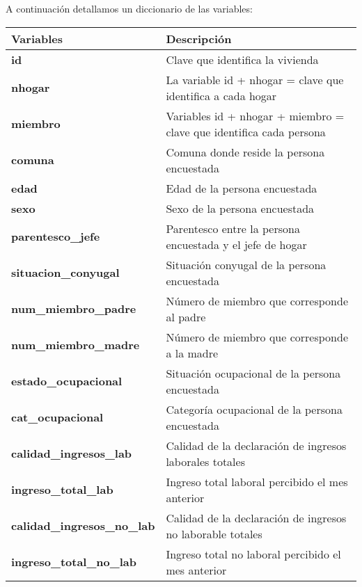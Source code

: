\documentclass[a4paper]{article}
\begin{document}
    A continuación detallamos un diccionario de las variables:
    \begin{table}[H]
    \begin{tabular}{|l|l|}
        \hline
        \textbf{Variables}                     & \textbf{Descripción} \\ \hline
        \textbf{id}                            & Clave que identifica la vivienda \\ \hline
        \textbf{nhogar}                        & La variable id + nhogar = clave que identifica a cada hogar \\ \hline
        \textbf{miembro}                       & Variables id + nhogar + miembro = clave que identifica  cada persona \\ \hline
        \textbf{comuna}                        & Comuna donde reside la persona encuestada \\ \hline
        \textbf{edad}                          & Edad de la persona encuestada \\ \hline
        \textbf{sexo}                          & Sexo de la persona encuestada \\ \hline
        \textbf{parentesco\_jefe}              & Parentesco entre la persona encuestada y el jefe de hogar \\ \hline
        \textbf{situacion\_conyugal}           & Situación conyugal de la persona encuestada \\ \hline
        \textbf{num\_miembro\_padre}           & Número de miembro que corresponde al padre \\ \hline
        \textbf{num\_miembro\_madre}           & Número de miembro que corresponde a la madre \\ \hline
        \textbf{estado\_ocupacional}           & Situación ocupacional de la persona encuestada \\ \hline
        \textbf{cat\_ocupacional}              & Categoría ocupacional de la persona encuestada \\ \hline
        \textbf{calidad\_ingresos\_lab}        & Calidad de la declaración de ingresos laborales totales \\ \hline
        \textbf{ingreso\_total\_lab}           & Ingreso total laboral percibido el mes anterior \\ \hline
        \textbf{calidad\_ingresos\_no\_lab}    & Calidad de la declaración de ingresos no laborable totales \\ \hline
        \textbf{ingreso\_total\_no\_lab}       & Ingreso total no laboral percibido el mes anterior \\ \hline

\end{tabular}
\end{table}
\end{document}
